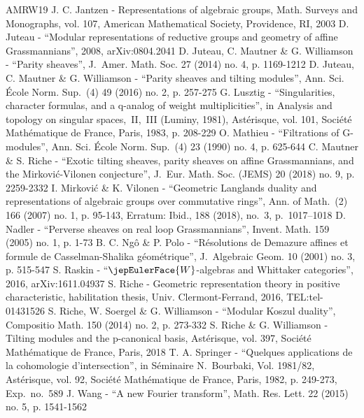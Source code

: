 \documentclass[10pt]{article}
\theoremstyle{remark}
\numberwithin{equation}{section}
\DeclareRobustCommand{\jepPubBibliographyW}{\jepEulerFace{W}}
\begin{document}
\begin{thebibliography}{AMRW19}
 J. C. Jantzen - Representations of algebraic groups, Math. Surveys and Monographs, vol. 107, American Mathematical Society, Providence, RI, 2003
 D. Juteau - “Modular representations of reductive groups and geometry of affine Grassmannians”, 2008, arXiv:0804.2041
 D. Juteau, C. Mautner \& G. Williamson - “Parity sheaves”, J. Amer. Math. Soc. 27 (2014) no. 4, p. 1169-1212
 D. Juteau, C. Mautner \& G. Williamson - “Parity sheaves and tilting modules”, Ann. Sci. École Norm. Sup. (4) 49 (2016) no. 2, p. 257-275
 G. Lusztig - “Singularities, character formulas, and a q-analog of weight multiplicities”, in Analysis and topology on singular spaces, II, III (Luminy, 1981), Astérisque, vol. 101, Société Mathématique de France, Paris, 1983, p. 208-229
 O. Mathieu - “Filtrations of G-modules”, Ann. Sci. École Norm. Sup. (4) 23 (1990) no. 4, p. 625-644
 C. Mautner \& S. Riche - “Exotic tilting sheaves, parity sheaves on affine Grassmannians, and the Mirković-Vilonen conjecture”, J. Eur. Math. Soc. (JEMS) 20 (2018) no. 9, p. 2259-2332
 I. Mirković \& K. Vilonen - “Geometric Langlands duality and representations of algebraic groups over commutative rings”, Ann. of Math. (2) 166 (2007) no. 1, p. 95-143, Erratum: Ibid., 188 (2018), no. 3, p. 1017–1018
 D. Nadler - “Perverse sheaves on real loop Grassmannians”, Invent. Math. 159 (2005) no. 1, p. 1-73
 B. C. Ngô \& P. Polo - “Résolutions de Demazure affines et formule de Casselman-Shalika géométrique”, J. Algebraic Geom. 10 (2001) no. 3, p. 515-547
 S. Raskin - “$\jepPubBibliographyW$-algebras and Whittaker categories”, 2016, arXiv:1611.04937
 S. Riche - Geometric representation theory in positive characteristic, habilitation thesis, Univ. Clermont-Ferrand, 2016, TEL:tel-01431526
 S. Riche, W. Soergel \& G. Williamson - “Modular Koszul duality”, Compositio Math. 150 (2014) no. 2, p. 273-332
 S. Riche \& G. Williamson - Tilting modules and the p-canonical basis, Astérisque, vol. 397, Société Mathématique de France, Paris, 2018
 T. A. Springer - “Quelques applications de la cohomologie d’intersection”, in Séminaire N. Bourbaki, Vol. 1981/82, Astérisque, vol. 92, Société Mathématique de France, Paris, 1982, p. 249-273, Exp. no. 589
 J. Wang - “A new Fourier transform”, Math. Res. Lett. 22 (2015) no. 5, p. 1541-1562
\end{thebibliography}
\end{document}
